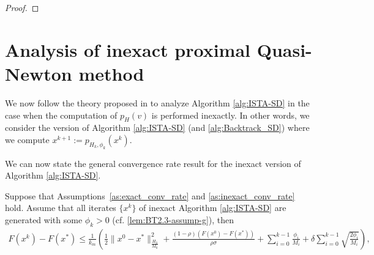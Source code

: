 \documentclass[11pt]{article}
\numberwithin{equation}{section}
\begin{document}
\begin{proof}
\end{proof}

\section{Analysis of inexact proximal Quasi-Newton method} %
\label{sec:conv_inexact}

We now follow the theory proposed in  \cite{Schmidtetal} to analyze Algorithm \ref{alg:ISTA-SD}  in the case when the computation of $p_H( v)$ is performed inexactly. 
In other words, we consider the version of Algorithm \ref{alg:ISTA-SD} (and \ref{alg:Backtrack_SD}) where we compute 
$x^{k+1}  := p_{H_k, \phi_k}(x^k)$.



We can now state the general convergence rate result for the inexact version of Algorithm \ref{alg:ISTA-SD}.

\begin{theorem}\label{th:inexact_conv_rate}
Suppose that Assumptions~\ref{as:exact_conv_rate} and \ref{as:inexact_conv_rate} hold. 
Assume that all iterates $\{x^k\}$ of inexact Algorithm \ref{alg:ISTA-SD} are generated with some $\phi_k>0$ (cf. \eqref{lem:BT2.3-assump-g}), then
\begin{align}
    \label{eq:bound_F_F*}
    F(x^k) - F(x^*) \leq 
    \frac{1}{k_m} \left( \frac{1}{2} \|x^0-x^*\|_{\frac{H_0}{M_0}}^2 
    + \frac{(1-\rho)(F(x^0)-F(x^*))}{\rho\sigma} 
    + \sum_{i=0}^{k-1}\frac{\phi_i}{M_i}
    + \delta\sum_{i=0}^{k-1} \sqrt{\frac{2\phi_i}{M_i}} \right),
\end{align}
\end{theorem}
\end{document}
